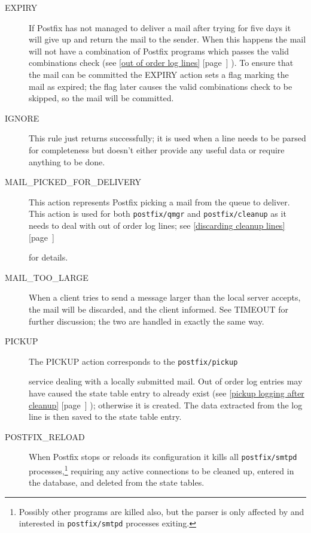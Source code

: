 \documentclass[a4paper,12pt,draft]{article}
\newcommand{\refwithpage}[1]{%
    \empty{}\ref{#1} [page~\pageref{#1}]%
}
\newcommand{\sectionref}[1]{%
    \textsection{}\refwithpage{#1}%
}
\newcommand{\daemon}[1]{%
    \texttt{postfix/#1}%
}
\begin{document}
\begin{description}
    \item [EXPIRY] If Postfix has not managed to deliver a mail after
        trying for five days it will give up and return the mail to the
        sender.  When this happens the mail will not have a combination of
        Postfix programs which passes the valid combinations check (see
        \sectionref{out of order log lines}).  To ensure that the mail can
        be committed the EXPIRY action sets a flag marking the mail as
        expired; the flag later causes the valid combinations check to be
        skipped, so the mail will be committed.

    \item [IGNORE] This rule just returns successfully; it is used when a
        line needs to be parsed for completeness but doesn't either provide
        any useful data or require anything to be done.

    \item [MAIL\_PICKED\_FOR\_DELIVERY] This action represents Postfix
        picking a mail from the queue to deliver. This action is used for
        both \daemon{qmgr} and \daemon{cleanup} as it needs to deal with
        out of order log lines; see \sectionref{discarding cleanup lines}
        for details.

    \item [MAIL\_TOO\_LARGE] When a client tries to send a message larger
        than the local server accepts, the mail will be discarded, and the
        client informed.  See TIMEOUT for further discussion; the two are
        handled in exactly the same way.

    \item [PICKUP] The PICKUP action corresponds to the \daemon{pickup}
        service dealing with a locally submitted mail.  Out of order log
        entries may have caused the state table entry to already exist (see
        \sectionref{pickup logging after cleanup}); otherwise it is
        created.  The data extracted from the log line is then saved to the
        state table entry.

    \item [POSTFIX\_RELOAD] When Postfix stops or reloads its configuration
        it kills all \daemon{smtpd} processes,\footnote{Possibly other
        programs are killed also, but the parser is only affected by and
        interested in \daemon{smtpd} processes exiting.} requiring any
        active connections to be cleaned up, entered in the database, and
        deleted from the state tables.


\end{description}
\end{document}
